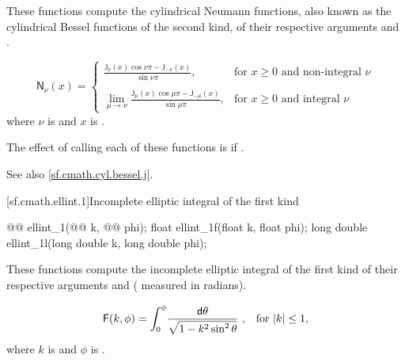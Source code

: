\begin{itemdescr}

\pnum
\effects
These functions compute the cylindrical Neumann functions,
also known as the cylindrical Bessel functions of the second kind,
of their respective arguments
 and .

\pnum
\returns
\[%
  \mathsf{N}_\nu(x) =
  \left\{
  \begin{array}{cl}
  \displaystyle
  \frac{\mathsf{J}_\nu(x) \cos \nu\pi - \mathsf{J}_{-\nu}(x)}
       {\sin \nu\pi },
  & \mbox{for $x \ge 0$ and non-integral $\nu$}
  \\
  \\
  \displaystyle
  \lim_{\mu \rightarrow \nu} \frac{\mathsf{J}_\mu(x) \cos \mu\pi - \mathsf{J}_{-\mu}(x)}
                                {\sin \mu\pi },
  & \mbox{for $x \ge 0$ and integral $\nu$}
  \end{array}
  \right.
\]
where
$\nu$ is  and
$x$ is .

\pnum
\remarks
The effect of calling each of these functions
is 
if .

\pnum
See also \ref{sf.cmath.cyl.bessel.j}.
\end{itemdescr}

[sf.cmath.ellint.1]{Incomplete elliptic integral of the first kind}%
%
%
%
%
%
\begin{itemdecl}
@@ ellint_1(@@ k, @@ phi);
float        ellint_1f(float k, float phi);
long double  ellint_1l(long double k, long double phi);
\end{itemdecl}

\begin{itemdescr}
\pnum
\effects
These functions compute
the incomplete elliptic integral of the first kind
of their respective arguments
 and  ( measured in radians).

\pnum
\returns
\[ \mathsf{F}(k, \phi) =
     \int_0^\phi \! \frac{\mathsf{d}\theta}{\sqrt{1 - k^2 \sin^2 \theta}}
     \text{ ,\quad for $|k| \le 1$,} \]
where
$k$ is  and
$\phi$ is .
\end{itemdescr}

